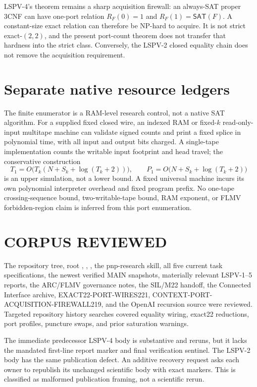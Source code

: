 \documentclass[11pt]{article}
\begin{document}
LSPV-4's theorem remains a sharp acquisition firewall: an always-SAT proper
3CNF can have one-port relation $R_F(0)=1$ and
$R_F(1)=\mathsf{SAT}(F)$. A constant-size exact relation can therefore be
NP-hard to acquire. It is not strict exact-$(2,2)$, and the present port-count
theorem does not transfer that hardness into the strict class. Conversely,
the LSPV-2 closed equality chain does not remove the acquisition requirement.

\section{Separate native resource ledgers}
The finite enumerator is a RAM-level research control, not a native SAT
algorithm. For a supplied fixed closed wire, an indexed RAM or fixed-$k$
read-only-input multitape machine can validate signed counts and print a fixed
splice in polynomial time, with all input and output bits charged. A
single-tape implementation counts the writable input footprint and head
travel; the conservative construction
\[
T_1=O\bigl(T_k(N+S_k+\log(T_k+2))\bigr),\qquad
P_1=O\bigl(N+S_k+\log(T_k+2)\bigr)
\]
is an upper simulation, not a lower bound. A fixed universal machine incurs
its own polynomial interpreter overhead and fixed program prefix. No
one-tape crossing-sequence bound, two-writable-tape bound, RAM exponent, or
FLMV forbidden-region claim is inferred from this port enumeration.

\section{CORPUS REVIEWED}
The repository tree, root , ,
, the pnp-research skill, all five current task specifications,
the newest verified MAIN snapshots, materially relevant LSPV-1--5 reports,
the ARC/FLMV governance notes, the SIL/M22 handoff, the Connected Interface
archive, EXACT22-PORT-WIRES221, CONTEXT-PORT-ACQUISITION-FIREWALL219, and the
OpenAI recursion source were reviewed. Targeted repository history searches
covered equality wiring, exact22 reductions, port profiles, puncture swaps,
and prior saturation warnings.

The immediate predecessor LSPV-4 body is substantive and reruns, but it lacks
the mandated first-line report marker and final verification sentinel. The
LSPV-2 body has the same publication defect. An additive recovery request
asks each owner to republish its unchanged scientific body with exact markers.
This is classified as malformed publication framing, not a scientific rerun.
\end{document}
